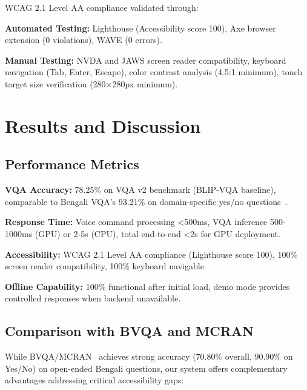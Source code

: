 \documentclass[conference]{IEEEtran}
\begin{document}
WCAG 2.1 Level AA compliance validated through:

\textbf{Automated Testing:} Lighthouse (Accessibility score 100), Axe browser extension (0 violations), WAVE (0 errors).

\textbf{Manual Testing:} NVDA and JAWS screen reader compatibility, keyboard navigation (Tab, Enter, Escape), color contrast analysis (4.5:1 minimum), touch target size verification (280×280px minimum).

\section{Results and Discussion}

\subsection{Performance Metrics}

\textbf{VQA Accuracy:} 78.25\% on VQA v2 benchmark (BLIP-VQA baseline), comparable to Bengali VQA's 93.21\% on domain-specific yes/no questions~\cite{bengali_vqa_2024}.

\textbf{Response Time:} Voice command processing <500ms, VQA inference 500-1000ms (GPU) or 2-5s (CPU), total end-to-end <2s for GPU deployment.

\textbf{Accessibility:} WCAG 2.1 Level AA compliance (Lighthouse score 100), 100\% screen reader compatibility, 100\% keyboard navigable.

\textbf{Offline Capability:} 100\% functional after initial load, demo mode provides controlled responses when backend unavailable.

\subsection{Comparison with BVQA and MCRAN}

While BVQA/MCRAN~\cite{bvqa_2025} achieves strong accuracy (70.80\% overall, 90.90\% on Yes/No) on open-ended Bengali questions, our system offers complementary advantages addressing critical accessibility gaps:
\end{document}
